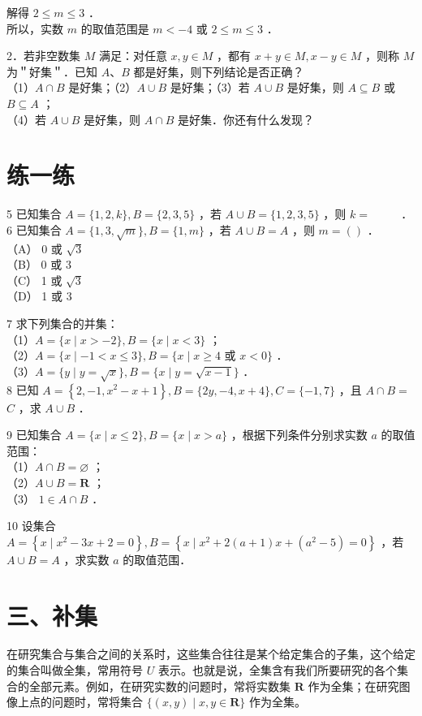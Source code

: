 \documentclass[10pt]{article}
\begin{document}
解得 \(2 \leqslant m \leqslant 3\) ．\\
所以，实数 \(m\) 的取值范围是 \(m<-4\) 或 \(2 \leqslant m \leqslant 3\) ．

2．若非空数集 \(M\) 满足：对任意 \(x, y \in M\) ，都有 \(x+y \in M, x-y \in M\) ，则称 \(M\)为＂好集＂．已知 \(A 、 B\) 都是好集，则下列结论是否正确？\\
（1）\(A \cap B\) 是好集；（2）\(A \cup B\) 是好集；（3）若 \(A \cup B\) 是好集，则 \(A \subseteq B\) 或 \(B \subseteq A\) ；\\
（4）若 \(A \cup B\) 是好集，则 \(A \cap B\) 是好集．你还有什么发现？

\section*{练一练}
5 已知集合 \(A=\{1,2, k\}, B=\{2,3,5\}\) ，若 \(A \cup B=\{1,2,3,5\}\) ，则 \(k=\) \(\qquad\) ．\\
6 已知集合 \(A=\{1,3, \sqrt{m}\}, B=\{1, m\}\) ，若 \(A \cup B=A\) ，则 \(m=()\) ．\\
（A） 0 或 \(\sqrt{3}\)\\
（B） 0 或 3\\
（C） 1 或 \(\sqrt{3}\)\\
（D） 1 或 3

7 求下列集合的并集：\\
（1）\(A=\{x \mid x>-2\}, B=\{x \mid x<3\}\) ；\\
（2）\(A=\{x \mid-1<x \leqslant 3\}, B=\{x \mid x \geqslant 4\) 或 \(x<0\}\) ．\\
（3）\(A=\{y \mid y=\sqrt{x}\}, B=\{x \mid y=\sqrt{x-1}\}\) ．\\
8 已知 \(A=\left\{2,-1, x^{2}-x+1\right\}, B=\{2 y,-4, x+4\}, C=\{-1,7\}\) ，且 \(A \cap B=\) \(C\) ，求 \(A \cup B\) ．

9 已知集合 \(A=\{x \mid x \leqslant 2\}, B=\{x \mid x>a\}\) ，根据下列条件分别求实数 \(a\) 的取值范围：\\
（1）\(A \cap B=\varnothing\) ；\\
（2）\(A \cup B=\mathbf{R}\) ；\\
（3） \(1 \in A \cap B\) ．

10 设集合 \(A=\left\{x \mid x^{2}-3 x+2=0\right\}, B=\left\{x \mid x^{2}+2(a+1) x+\left(a^{2}-5\right)=0\right\}\) ，若 \(A \cup B=A\) ，求实数 \(a\) 的取值范围．

\section*{三、补集}
在研究集合与集合之间的关系时，这些集合往往是某个给定集合的子集，这个给定的集合叫做全集，常用符号 \(U\) 表示。也就是说，全集含有我们所要研究的各个集合的全部元素。例如，在研究实数的问题时，常将实数集 \(\mathbf{R}\) 作为全集；在研究图像上点的问题时，常将集合 \(\{(x, y) \mid x, y \in \mathbf{R}\}\) 作为全集。
\end{document}
